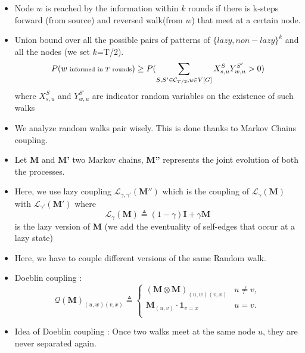 \documentclass{beamer}
\begin{document}
\begin{frame}
\begin {itemize}
\frametitle{Probabilistic computations}
\item Node $w$ is reached by the information within $k$ rounds if there is k-steps forward (from source) and reversed walk(from $w$) that meet at a certain node.
\item  Union bound over all the possible pairs of patterns of $\{ lazy,non-lazy \}^k$ and all the nodes (we set $k$=T/2).
\begin{align*}
  \scriptsize
  P(w \text{ informed in $T$ rounds}) \geq P(\sum_{S,S'\in \mathcal C_{T/2}, u\in V[G]} X_{s,u}^S Y_{w,u}^{S'} > 0)
\end{align*}
 where $X_{s,u}^S$ and $Y_{w,u}^{S'}$ are indicator random variables on the existence of such walks

\end{itemize}


\end{frame}

\begin {frame}
\begin{itemize}
\frametitle{Matrix coupling (1/2)}
\item We analyze random walks pair wisely. This is done thanks to Markov Chains coupling.
\item Let \textbf{M} and \textbf{M'} two Markov chains, \textbf{M''} represents the joint evolution of both the processes.
\item Here, we use lazy coupling $\mathcal L_{\gamma, \gamma'}(\mathbf{M''})$ which is the coupling of $\mathcal L_\gamma(\mathbf{M})$ with $\mathcal L_{\gamma'}(\mathbf{M'})$ 
  where \[
  \mathcal L _ \gamma (\mathbf{M}) \triangleq (1-\gamma) \mathbf{I} + \gamma \mathbf{M}
\] is the lazy version of \textbf{M} (we add the eventuality of self-edges that occur at a lazy state)

\end{itemize}
\end {frame}


\begin{frame}
\begin{itemize}
\frametitle{Matrix coupling (2/2)}
\item Here, we have to couple different versions of the same Random walk.
\item Doeblin coupling  : 
\[
  \mathcal Q(\mathbf{M})_{(u,w)(v,x)} \triangleq \left\{
    \begin{array}{ll}
      (\mathbf{M} \otimes \mathbf{M})_{(u,w)(v,x)} & u \not = v,\\
      \mathbf{M}_{(u,v)} \cdot \mathbf{1}_{v = x} & u = v.\\
    \end{array}
  \right.
\]
\item Idea of Doeblin coupling : Once two walks meet at the same node $u$, they are never separated again. 

\end{itemize}


\end {frame}
\end{document}
